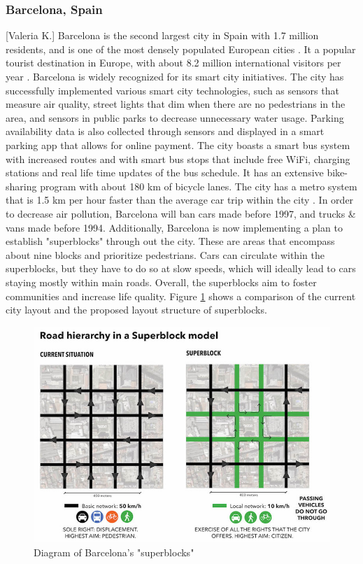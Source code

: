 \documentclass[12pt]{article}                       %
\begin{document}
\subsubsection{Barcelona, Spain}[Valeria K.]
Barcelona is the second largest city in Spain with 1.7 million residents, and is one of the most densely populated European cities \cite{Bausells2016SuperblocksResidents}. It a popular tourist destination in Europe, with about 8.2 million international visitors per year \cite{Bausells2016SuperblocksResidents}. Barcelona is widely recognized for its smart city initiatives. The city has successfully implemented various smart city technologies, such as sensors that measure air quality, street lights that dim when there are no pedestrians in the area, and sensors in public parks to decrease unnecessary water usage. Parking availability data is also collected through sensors and displayed in a smart parking app that allows for online payment. The city boasts a smart bus system with increased routes and with smart bus stops that include free WiFi, charging stations and real life time updates of the bus schedule. It has an extensive bike-sharing program with about 180 km of bicycle lanes. The city has a metro system that is 1.5 km per hour faster than the average car trip within the city \cite{Bausells2016SuperblocksResidents}. In order to decrease air pollution, Barcelona will ban cars made before 1997, and trucks \& vans made before 1994. Additionally, Barcelona is now implementing a plan to establish "superblocks" through out the city. These are areas that encompass about nine blocks and prioritize pedestrians. Cars can circulate within the superblocks, but they have to do so at slow speeds, which will ideally lead to cars staying mostly within main roads. Overall, the superblocks aim to foster communities and increase life quality. Figure \ref{img:barcelona_superblock} shows a comparison of the current city layout and the proposed layout structure of superblocks.

\begin{figure}[H]
    \centering
    \includegraphics[scale=4.5]{images/barcelona_superblock.jpg}
    \caption{Diagram of Barcelona's "superblocks"}
    \label{img:barcelona_superblock}
\end{figure}
\end{document}
